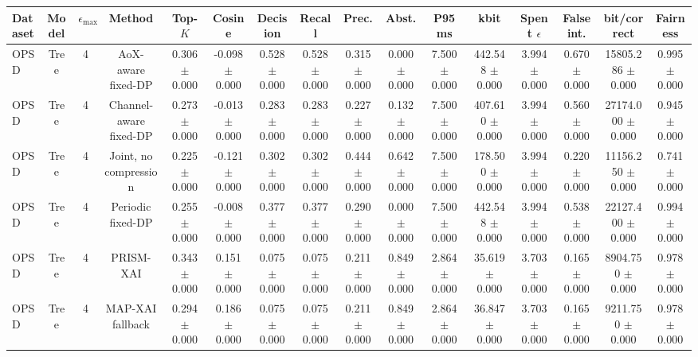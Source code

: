 \begin{tabular}{lccccccccccccccc}
\toprule
Dataset & Model & $\epsilon_{\max}$ & Method & Top-$K$ & Cosine & Decision & Recall & Prec. & Abst. & P95 ms & kbit & Spent $\epsilon$ & False int. & bit/correct & Fairness \\
\midrule
OPSD & Tree & 4 & AoX-aware fixed-DP & 0.306 $\pm$ 0.000 & -0.098 $\pm$ 0.000 & 0.528 $\pm$ 0.000 & 0.528 $\pm$ 0.000 & 0.315 $\pm$ 0.000 & 0.000 $\pm$ 0.000 & 7.500 $\pm$ 0.000 & 442.548 $\pm$ 0.000 & 3.994 $\pm$ 0.000 & 0.670 $\pm$ 0.000 & 15805.286 $\pm$ 0.000 & 0.995 $\pm$ 0.000 \\
OPSD & Tree & 4 & Channel-aware fixed-DP & 0.273 $\pm$ 0.000 & -0.013 $\pm$ 0.000 & 0.283 $\pm$ 0.000 & 0.283 $\pm$ 0.000 & 0.227 $\pm$ 0.000 & 0.132 $\pm$ 0.000 & 7.500 $\pm$ 0.000 & 407.610 $\pm$ 0.000 & 3.994 $\pm$ 0.000 & 0.560 $\pm$ 0.000 & 27174.000 $\pm$ 0.000 & 0.945 $\pm$ 0.000 \\
OPSD & Tree & 4 & Joint, no compression & 0.225 $\pm$ 0.000 & -0.121 $\pm$ 0.000 & 0.302 $\pm$ 0.000 & 0.302 $\pm$ 0.000 & 0.444 $\pm$ 0.000 & 0.642 $\pm$ 0.000 & 7.500 $\pm$ 0.000 & 178.500 $\pm$ 0.000 & 3.994 $\pm$ 0.000 & 0.220 $\pm$ 0.000 & 11156.250 $\pm$ 0.000 & 0.741 $\pm$ 0.000 \\
OPSD & Tree & 4 & Periodic fixed-DP & 0.255 $\pm$ 0.000 & -0.008 $\pm$ 0.000 & 0.377 $\pm$ 0.000 & 0.377 $\pm$ 0.000 & 0.290 $\pm$ 0.000 & 0.000 $\pm$ 0.000 & 7.500 $\pm$ 0.000 & 442.548 $\pm$ 0.000 & 3.994 $\pm$ 0.000 & 0.538 $\pm$ 0.000 & 22127.400 $\pm$ 0.000 & 0.994 $\pm$ 0.000 \\
OPSD & Tree & 4 & PRISM-XAI & 0.343 $\pm$ 0.000 & 0.151 $\pm$ 0.000 & 0.075 $\pm$ 0.000 & 0.075 $\pm$ 0.000 & 0.211 $\pm$ 0.000 & 0.849 $\pm$ 0.000 & 2.864 $\pm$ 0.000 & 35.619 $\pm$ 0.000 & 3.703 $\pm$ 0.000 & 0.165 $\pm$ 0.000 & 8904.750 $\pm$ 0.000 & 0.978 $\pm$ 0.000 \\
OPSD & Tree & 4 & MAP-XAI fallback & 0.294 $\pm$ 0.000 & 0.186 $\pm$ 0.000 & 0.075 $\pm$ 0.000 & 0.075 $\pm$ 0.000 & 0.211 $\pm$ 0.000 & 0.849 $\pm$ 0.000 & 2.864 $\pm$ 0.000 & 36.847 $\pm$ 0.000 & 3.703 $\pm$ 0.000 & 0.165 $\pm$ 0.000 & 9211.750 $\pm$ 0.000 & 0.978 $\pm$ 0.000 \\
\bottomrule
\end{tabular}
